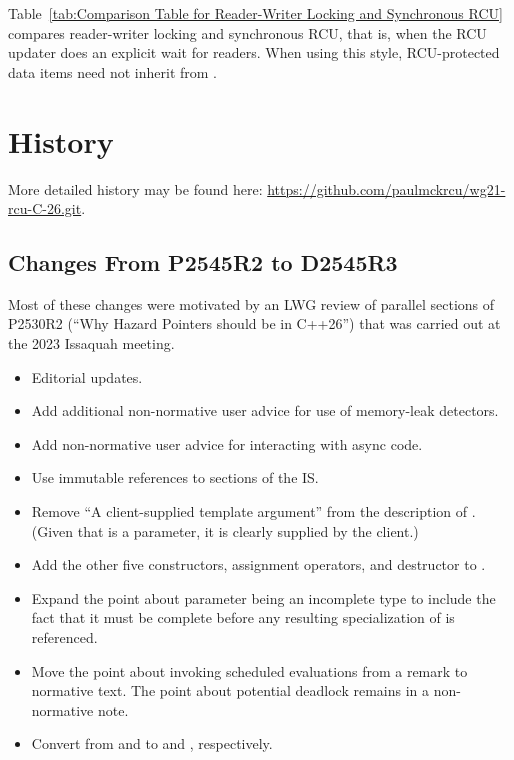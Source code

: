 Table~\ref{tab:Comparison Table for Reader-Writer Locking and Synchronous RCU}
compares reader-writer locking and synchronous RCU, that is, when the
RCU updater does an explicit wait for readers.
When using this style, RCU-protected data items need not inherit from
.

\section{History}
\label{sec:History}

More detailed history may be found here:
\url{https://github.com/paulmckrcu/wg21-rcu-C-26.git}.

\subsection{Changes From P2545R2 to D2545R3}
\label{sec:Changes From P2545R2 to D2545R3}

Most of these changes were motivated by an LWG review of parallel sections
of P2530R2 (``Why Hazard Pointers should be in C++26'') that was carried
out at the 2023 Issaquah meeting.

\begin{itemize}
\item	Editorial updates.
\item	Add additional non-normative user advice for use of memory-leak
	detectors.
\item	Add non-normative user advice for interacting with async code.
\item	Use immutable references to sections of the IS.
\item	Remove ``A client-supplied template argument'' from the description
	of .
	(Given that  is a parameter, it is clearly supplied by
	the client.)
\item	Add the other five constructors, assignment operators, and
	destructor to .
\item	Expand the point about parameter  being an incomplete
	type to include the fact that it must be complete before any
	resulting specialization of  is referenced.
\item	Move the point about  invoking scheduled evaluations
	from a remark to normative text.
	The point about potential deadlock remains in a non-normative note.
\item	Convert from  and  to  and
	, respectively.
\end{itemize}

